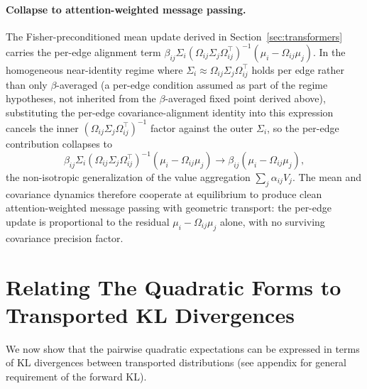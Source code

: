 \documentclass[11pt]{article}
\begin{document}
\paragraph{Collapse to attention-weighted message passing.}
The Fisher-preconditioned mean update derived in Section~\ref{sec:transformers} carries the per-edge alignment term $\beta_{ij} \Sigma_i (\Omega_{ij}\Sigma_j\Omega_{ij}^\top)^{-1}(\mu_i - \Omega_{ij}\mu_j)$. In the homogeneous near-identity regime where $\Sigma_i \approx \Omega_{ij}\Sigma_j\Omega_{ij}^\top$ holds per edge rather than only $\beta$-averaged (a per-edge condition assumed as part of the regime hypotheses, not inherited from the $\beta$-averaged fixed point derived above), substituting the per-edge covariance-alignment identity into this expression cancels the inner $(\Omega_{ij}\Sigma_j\Omega_{ij}^\top)^{-1}$ factor against the outer $\Sigma_i$, so the per-edge contribution collapses to
\begin{equation}
\beta_{ij} \Sigma_i (\Omega_{ij}\Sigma_j\Omega_{ij}^\top)^{-1}(\mu_i - \Omega_{ij}\mu_j) \longrightarrow \beta_{ij}(\mu_i - \Omega_{ij}\mu_j),
\end{equation}
the non-isotropic generalization of the value aggregation $\sum_j \alpha_{ij} V_j$. The mean and covariance dynamics therefore cooperate at equilibrium to produce clean attention-weighted message passing with geometric transport: the per-edge update is proportional to the residual $\mu_i - \Omega_{ij}\mu_j$ alone, with no surviving covariance precision factor.

\section{Relating The Quadratic Forms to Transported KL Divergences}
We now show that the pairwise quadratic expectations can be expressed in terms of KL divergences between transported distributions (see appendix for general requirement of the forward KL).
\end{document}
